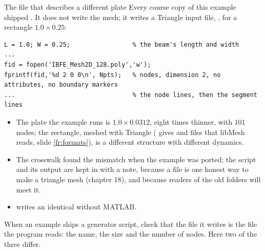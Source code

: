 \documentclass[aspectratio=169,11pt]{beamer}
\begin{document}
\begin{frame}[fragile]{The  file that describes a different plate}
\label{fr:poly}
\footnotesize
Every course copy of this example shipped . It does not write the  mesh; it writes a Triangle input file, , for a rectangle $1.0 \times 0.25$:
\begin{lstlisting}[style=matlabtiny]
L = 1.0; W = 0.25;                 % the beam's length and width
...
fid = fopen('IBFE_Mesh2D_128.poly','w');
fprintf(fid,'%d 2 0 0\n', Npts);   % nodes, dimension 2, no attributes, no boundary markers
...                                % the node lines, then the segment lines
\end{lstlisting}
\begin{itemize}
  \item The plate the example runs is $1.0 \times 0.0312$, eight times thinner, with $101$ nodes; the  rectangle, meshed with Triangle ( gives  and  files that libMesh reads, slide \ref{fr:formats}), is a different structure with different dynamics.
  \item The crosswalk found the mismatch when the example was ported; the script and its output are kept in  with a note, because a  file is one honest way to make a triangle mesh (chapter 18), and because readers of the old folders will meet it.
  \item {} writes an identical  without MATLAB.
\end{itemize}
\begin{punchbox}
\footnotesize When an example ships a generator script, check that the file it writes is the file the program reads: the name, the size and the number of nodes. Here two of the three differ.
\end{punchbox}
\end{frame}
\end{document}
